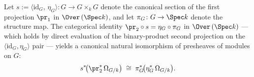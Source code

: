 \begin{lemma}
  \label{lem:GrpObj_omega_restrict_to_identity_section}
  
  Let \(s := \langle \mathrm{id}_{G},\, \eta_{G} \rangle \colon G \to G \times_{k} G\) denote the canonical section of the first projection \(\pr_{1}\) in \(\Over\,(\Spec k)\), and let \(\pi_{G} \colon G \to \Spec k\) denote the structure map. The categorical identity \(\pr_{2} \circ s = \eta_{G} \circ \pi_{G}\) in \(\Over\,(\Spec k)\) — which holds by direct evaluation of the binary-product second projection on the \(\langle \mathrm{id}_{G}, \eta_{G} \rangle\) pair — yields a canonical natural isomorphism of presheaves of modules on \(G\):
  \[
    s^{*}\!\bigl(\pr_{2}^{*}\,\Omega_{G/k}\bigr) \;\cong\; \pi_{G}^{*}\!\bigl(\eta_{G}^{*}\,\Omega_{G/k}\bigr).
  \]
\end{lemma}

